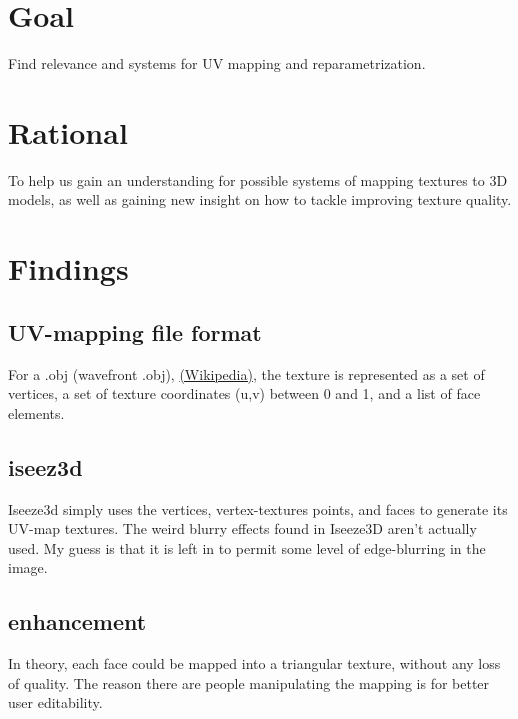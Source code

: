 \documentclass{article}
\begin{document}
\section{Goal}

Find relevance and systems for UV mapping and reparametrization.

\section{Rational}

To help us gain an understanding for possible systems of mapping textures to 3D models, as well as gaining new insight on how to tackle improving texture quality.

\section{Findings}

\subsection{UV-mapping file format}
For a .obj (wavefront .obj), \href{https://en.wikipedia.org/wiki/Wavefront_.obj_file}{(Wikipedia)}, the texture is represented as a set of vertices, a set of texture coordinates (u,v) between 0 and 1, and a list of face elements.

\subsection{iseez3d}
Iseeze3d simply uses the vertices, vertex-textures points, and faces to generate its UV-map textures. The weird blurry effects found in Iseeze3D aren't actually used. My guess is that it is left in to permit some level of edge-blurring in the image.

\subsection{enhancement}
In theory, each face could be mapped into a triangular texture, without any loss of quality. The reason there are people manipulating the mapping is for better user editability.

 
\end{document}
